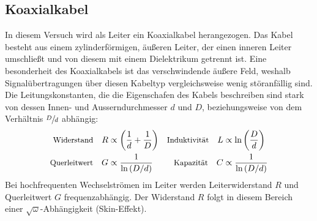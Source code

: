 \subsection{Koaxialkabel} %
\label{sub:koaxialkabel}
In diesem Versuch wird als Leiter ein Koaxialkabel herangezogen.
Das Kabel besteht aus einem zylinderförmigen, äußeren Leiter,
der einen inneren Leiter umschließt und von diesem mit einem
Dielektrikum getrennt ist.
Eine besonderheit des Koaxialkabels ist das verschwindende äußere
Feld, weshalb Signalübertragungen über diesen Kabeltyp vergleichsweise
wenig störanfällig sind.
Die Leitungskonstanten, die die Eigenschafen des Kabels beschreiben
sind stark von dessen Innen- und
Ausserndurchmesser $d$ und $D$, beziehungsweise von dem Verhältnis
$\sfrac{D}{d}$ abhängig:
\begin{align*}
    \text{\small Widerstand}\quad R &\propto \left(\frac{1}{d}+\frac{1}{D}\right) &
    \text{\small Induktivität}\quad L &\propto \text{ln}\left(\frac{D}{d}\right) \\
    \text{\small Querleitwert}\quad G &\propto \frac{1}{\text{ln}\left(D/d\right)} &
    \text{\small Kapazität}\quad C &\propto \frac{1}{\text{ln}\left(D/d\right)} \\
\end{align*}
Bei hochfrequenten Wechselströmen im Leiter werden Leiterwiderstand $R$ und
Querleitwert $G$ frequenzabhängig.
Der Widerstand $R$ folgt in diesem Bereich einer $\sqrt{\omega}$-Abhängigkeit
(Skin-Effekt).

